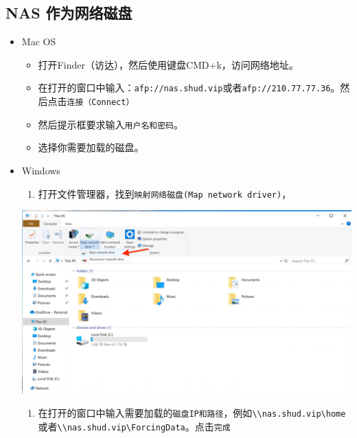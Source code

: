\documentclass[
]{ctexbook}
\providecommand{\tightlist}{%
  \setlength{\itemsep}{0pt}\setlength{\parskip}{0pt}}
\begin{document}
\hypertarget{nas-ux4f5cux4e3aux7f51ux7edcux78c1ux76d8}{%
\subsection{NAS 作为网络磁盘}\label{nas-ux4f5cux4e3aux7f51ux7edcux78c1ux76d8}}

\begin{itemize}
\item
  Mac OS

  \begin{itemize}
  \tightlist
  \item
    打开Finder（访达），然后使用键盘CMD+k，访问网络地址。
  \item
    在打开的窗口中输入：\texttt{afp://nas.shud.vip}或者\texttt{afp://210.77.77.36}。然后点击\texttt{连接（Connect）}
  \item
    然后提示框要求输入\texttt{用户名和密码}。
  \item
    选择你需要加载的磁盘。
  \end{itemize}
\item
  Windows

  \begin{enumerate}
  \def\labelenumi{\arabic{enumi}.}
  \tightlist
  \item
    打开文件管理器，找到\texttt{映射网络磁盘(Map\ network\ driver)}，
  \end{enumerate}

  \includegraphics{Fig/ch5/win_mapdisk-1.png}

  \begin{enumerate}
  \def\labelenumi{\arabic{enumi}.}
  \tightlist
  \item
    在打开的窗口中输入需要加载的\texttt{磁盘IP和路径}，例如\texttt{\textbackslash{}\textbackslash{}nas.shud.vip\textbackslash{}home}或者\texttt{\textbackslash{}\textbackslash{}nas.shud.vip\textbackslash{}ForcingData}。点击\texttt{完成}
  \end{enumerate}


\end{itemize}
\end{document}
